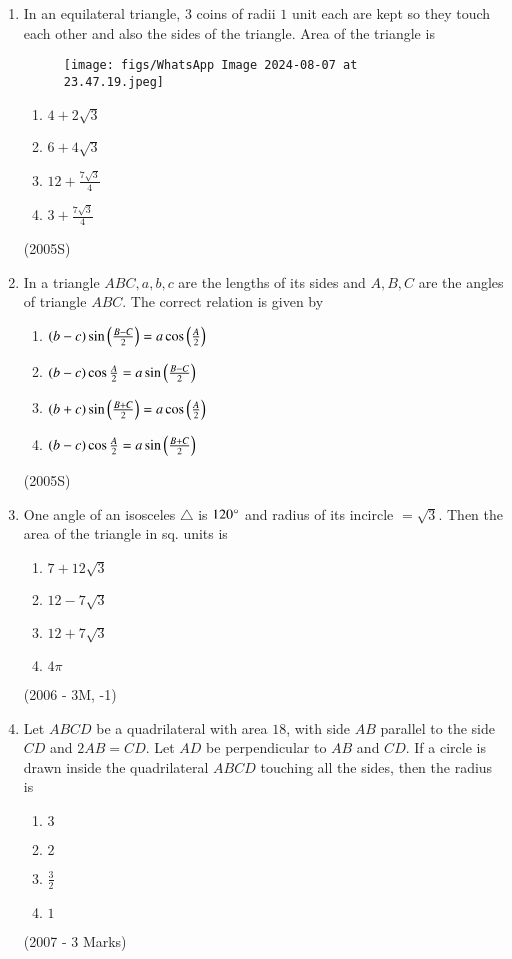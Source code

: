 \documentclass[journal,12pt,twocolumn]{IEEEtran}
\theoremstyle{remark}
\begin{document}
\begin{enumerate}
\item In an equilateral triangle, $3$ coins of radii $1$ unit each are kept so they touch each other and also the sides of the triangle. Area of the triangle is 
\begin{figure}
    \centering
    \texttt{[image: figs/WhatsApp Image 2024-08-07 at 23.47.19.jpeg]}
    \label{fig:enter-label}
\end{figure}
\begin{enumerate}
\item $4+2\sqrt{3}$
\item $6+4\sqrt{3}$
\item $12+\frac{7\sqrt{3}}{4}$
\item $3+\frac{7\sqrt{3}}{4}$
\end{enumerate}
\hfill (2005S)

\item In a triangle $ABC, a, b, c$  are the lengths of its sides and $A, B, C$ are the angles of triangle $ABC$. The correct relation is given by
\begin{enumerate}
\item $(b-c)\sin \left(\frac{B-C}{2}\right) = a \cos \left(\frac{A}{2}\right)$
\item $(b-c) \cos \frac{A}{2} = a \sin \left(\frac{B-C}{2}\right)$
\item $(b+c)\sin \left(\frac{B+C}{2}\right) = a \cos \left(\frac{A}{2}\right)$
\item $(b-c) \cos \frac{A}{2} = a \sin \left(\frac{B+C}{2}\right)$
\end{enumerate}
\hfill (2005S)

\item One angle of an isosceles $\triangle$ is $120\degree$ and radius of its incircle $= \sqrt{3}$. Then the area of the triangle in sq. units is 
\begin{enumerate}
\item $7+12\sqrt{3}$
\item $12-7\sqrt{3}$
\item $12+7\sqrt{3}$
\item $4\pi$
\end{enumerate}
\hfill (2006 - 3M, -1)

\item Let $ABCD$ be a quadrilateral with area $18$, with side $AB$ parallel to the side $CD$ and $2AB = CD$. Let $AD$ be perpendicular to $AB$ and $CD$. If a circle is drawn inside the quadrilateral $ABCD$ touching all the sides, then the radius is
\begin{enumerate}
\item $3$
\item $2$
\item $\frac{3}{2}$
\item $1$
\end{enumerate}
\hfill (2007 - 3 Marks)


\end{enumerate}
\end{document}
